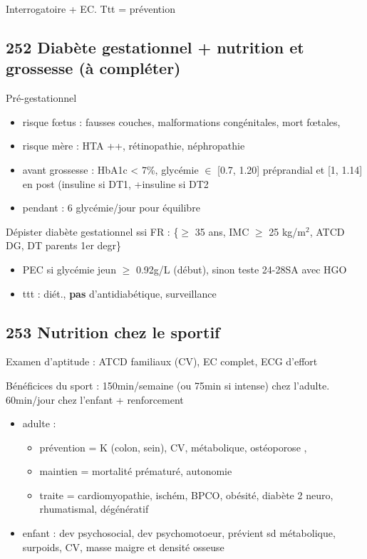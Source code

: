\documentclass[11pt]{article}
\begin{document}
Interrogatoire + EC. Ttt = prévention
\subsection{252 Diabète gestationnel + nutrition et grossesse (à compléter)}
\label{sec:org8d35244}
Pré-gestationnel
\begin{itemize}
\item risque f\oe{}tus : fausses couches, malformations congénitales, mort f\oe{}tales,
\item risque mère : HTA ++, rétinopathie, néphropathie
\item avant grossesse : HbA1c < 7\%, glycémie \(\in\) [0.7, 1.20] préprandial et [1,
1.14] en post (\inc insuline si DT1, +insuline si DT2
\item pendant : 6 glycémie/jour pour équilibre
\end{itemize}
Dépister diabète gestationnel ssi FR : \{\(\ge\) 35 ans, IMC \(\ge\) 25 kg/m\(^{\text{2}}\), ATCD DG,
DT parents 1er degr\}
\begin{itemize}
\item PEC si glycémie jeun \(\ge\) 0.92g/L (début), sinon teste 24-28SA avec HGO
\item ttt : diét., \textbf{pas} d'antidiabétique, surveillance
\end{itemize}

\subsection{253 Nutrition chez le sportif}
\label{sec:org1c31a10}
Examen d'aptitude : ATCD familiaux (CV),  EC complet, ECG d'effort

Bénéficices du sport : 150min/semaine (ou 75min si intense) chez
l'adulte. 60min/jour chez l'enfant + renforcement
\begin{itemize}
\item adulte : 
\begin{itemize}
\item prévention = K (colon, sein), CV, métabolique, ostéoporose \female,
\item maintien = \dec mortalité prématuré, \inc autonomie
\item traite = cardiomyopathie, ischém, BPCO, obésité, diabète 2 neuro,
rhumatismal, dégénératif
\end{itemize}
\item enfant : dev psychosocial, dev psychomotoeur, prévient sd métabolique,
surpoids, CV, \inc masse maigre et densité osseuse
\end{itemize}
\end{document}
